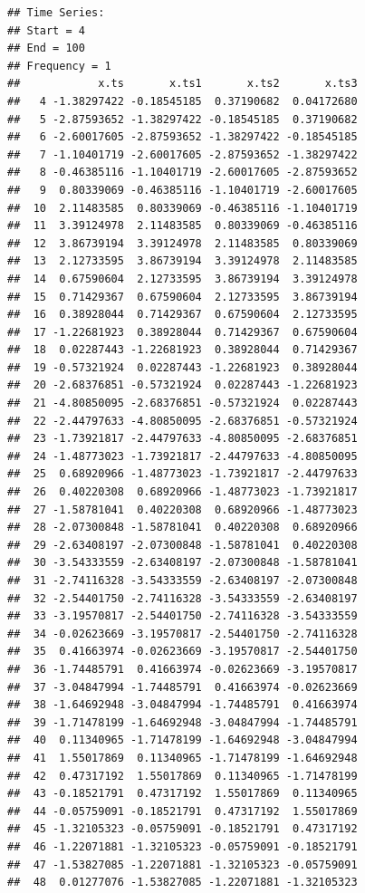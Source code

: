 \documentclass[
]{book}
\theoremstyle{definition}
\theoremstyle{definition}
\theoremstyle{definition}
\theoremstyle{definition}
\theoremstyle{remark}
\begin{document}
\begin{verbatim}
## Time Series:
## Start = 4 
## End = 100 
## Frequency = 1 
##            x.ts       x.ts1       x.ts2       x.ts3
##   4 -1.38297422 -0.18545185  0.37190682  0.04172680
##   5 -2.87593652 -1.38297422 -0.18545185  0.37190682
##   6 -2.60017605 -2.87593652 -1.38297422 -0.18545185
##   7 -1.10401719 -2.60017605 -2.87593652 -1.38297422
##   8 -0.46385116 -1.10401719 -2.60017605 -2.87593652
##   9  0.80339069 -0.46385116 -1.10401719 -2.60017605
##  10  2.11483585  0.80339069 -0.46385116 -1.10401719
##  11  3.39124978  2.11483585  0.80339069 -0.46385116
##  12  3.86739194  3.39124978  2.11483585  0.80339069
##  13  2.12733595  3.86739194  3.39124978  2.11483585
##  14  0.67590604  2.12733595  3.86739194  3.39124978
##  15  0.71429367  0.67590604  2.12733595  3.86739194
##  16  0.38928044  0.71429367  0.67590604  2.12733595
##  17 -1.22681923  0.38928044  0.71429367  0.67590604
##  18  0.02287443 -1.22681923  0.38928044  0.71429367
##  19 -0.57321924  0.02287443 -1.22681923  0.38928044
##  20 -2.68376851 -0.57321924  0.02287443 -1.22681923
##  21 -4.80850095 -2.68376851 -0.57321924  0.02287443
##  22 -2.44797633 -4.80850095 -2.68376851 -0.57321924
##  23 -1.73921817 -2.44797633 -4.80850095 -2.68376851
##  24 -1.48773023 -1.73921817 -2.44797633 -4.80850095
##  25  0.68920966 -1.48773023 -1.73921817 -2.44797633
##  26  0.40220308  0.68920966 -1.48773023 -1.73921817
##  27 -1.58781041  0.40220308  0.68920966 -1.48773023
##  28 -2.07300848 -1.58781041  0.40220308  0.68920966
##  29 -2.63408197 -2.07300848 -1.58781041  0.40220308
##  30 -3.54333559 -2.63408197 -2.07300848 -1.58781041
##  31 -2.74116328 -3.54333559 -2.63408197 -2.07300848
##  32 -2.54401750 -2.74116328 -3.54333559 -2.63408197
##  33 -3.19570817 -2.54401750 -2.74116328 -3.54333559
##  34 -0.02623669 -3.19570817 -2.54401750 -2.74116328
##  35  0.41663974 -0.02623669 -3.19570817 -2.54401750
##  36 -1.74485791  0.41663974 -0.02623669 -3.19570817
##  37 -3.04847994 -1.74485791  0.41663974 -0.02623669
##  38 -1.64692948 -3.04847994 -1.74485791  0.41663974
##  39 -1.71478199 -1.64692948 -3.04847994 -1.74485791
##  40  0.11340965 -1.71478199 -1.64692948 -3.04847994
##  41  1.55017869  0.11340965 -1.71478199 -1.64692948
##  42  0.47317192  1.55017869  0.11340965 -1.71478199
##  43 -0.18521791  0.47317192  1.55017869  0.11340965
##  44 -0.05759091 -0.18521791  0.47317192  1.55017869
##  45 -1.32105323 -0.05759091 -0.18521791  0.47317192
##  46 -1.22071881 -1.32105323 -0.05759091 -0.18521791
##  47 -1.53827085 -1.22071881 -1.32105323 -0.05759091
##  48  0.01277076 -1.53827085 -1.22071881 -1.32105323

\end{verbatim}
\end{document}
